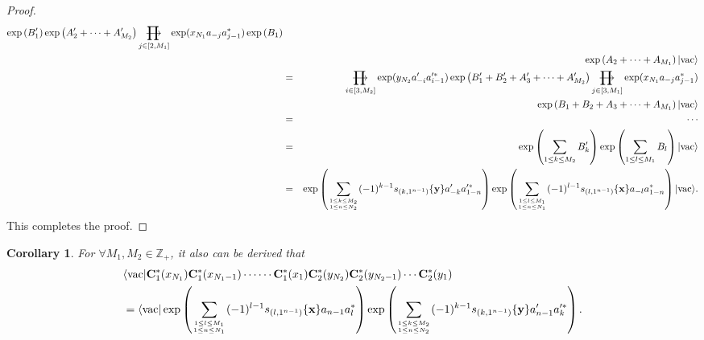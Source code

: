 \documentclass[10pt,a4paper]{amsart}
\numberwithin{equation}{section}
\newtheorem{corollary}[theorem]{Corollary}
\def\rprod{\mathop{\prod{\mkern-28.0mu}{\mathbf\longrightarrow}}}
\begin{document}
\begin{proof}
\begin{eqnarray}
\exp\left(B^{\prime}_{1}\right)\exp\left(A^{\prime}_{2}+\cdots+A^{\prime}_{M_{2}}\right)
\rprod\limits_{j\in[2,M_{1}]}\exp(x_{N_{1}}a_{-j}a^{\ast}_{j-1})
\exp\left(B_{1}\right)\notag\\
&&\exp\left(A_{2}+\cdots+A_{M_{1}}\right)|\text{vac}\rangle\notag\\
&=&\rprod\limits_{i\in[3,M_{2}]}\exp(y_{N_{2}}a^{\prime}_{-i}a^{\prime\ast}_{i-1})
\exp\left(B^{\prime}_{1}+B^{\prime}_{2}+A^{\prime}_{3}+\cdots+A^{\prime}_{M_{2}}\right)
\rprod\limits_{j\in[3,M_{1}]}\exp(x_{N_{1}}a_{-j}a^{\ast}_{j-1})\notag\\
&&\exp\left(B_{1}+B_{2}+A_{3}+\cdots+A_{M_{1}}\right)|\text{vac}\rangle\notag\\
&=&\cdots\notag\\
&=&\exp\left(\sum\limits_{1\leq k\leq M_{2}}B^{\prime}_{k}\right)
\exp\left(\sum\limits_{1\leq l\leq M_{1}}B_{l}\right)|\text{vac}\rangle\notag\\
&=&\exp\left(\sum\limits_{1\leq k\leq M_{2}\atop{1\leq n\leq N_{2}}}(-1)^{k-1}s_{(k,1^{n-1})}\{\mathbf{y}\}a^{\prime}_{-k}a^{\prime\ast}_{1-n}\right)
\exp\left(\sum\limits_{1\leq l\leq M_{1}\atop{1\leq n\leq N_{1}}}(-1)^{l-1}s_{(l,1^{n-1})}\{\mathbf{x}\}a_{-l}a^{\ast}_{1-n}\right)|\text{vac}\rangle.
\notag\\
\end{eqnarray}
This completes the proof.
\end{proof}

\begin{corollary}
For $\forall M_{1}, M_{2}\in\mathbb{Z}_{+}$, it also can be derived that
\begin{align}
&\langle\text{vac}|\mathbf{C}^{\ast}_{1}(x_{N_{1}})\mathbf{C}^{\ast}_{1}(x_{N_{1}-1})
\cdots\cdots\mathbf{C}^{\ast}_{1}(x_{1})\mathbf{C}^{\ast}_{2}(y_{N_{2}})
\mathbf{C}^{\ast}_{2}(y_{N_{2}-1})\cdots\mathbf{C}^{\ast}_{2}(y_{1})\notag\\
&=\langle\text{vac}|\exp\left(\sum\limits_{1\leq l\leq M_{1}\atop{1\leq n\leq N_{1}}}(-1)^{l-1}s_{(l,1^{n-1})}\{\mathbf{x}\}a_{n-1}a^{\ast}_{l}\right)
\exp\left(\sum\limits_{1\leq k\leq M_{2}\atop{1\leq n\leq N_{2}}}(-1)^{k-1}s_{(k,1^{n-1})}\{\mathbf{y}\}a^{\prime}_{n-1}a^{\prime\ast}_{k}\right).
\end{align}
\end{corollary}
\end{document}
